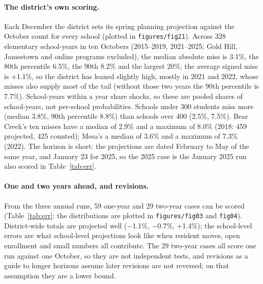 \documentclass[11pt]{article}
\begin{document}
\paragraph{The district's own scoring.} Each December the district sets its spring planning projection against the October count for every school (plotted in \texttt{figures/fig21}). Across 328 elementary school-years in ten Octobers (2015--2019, 2021--2025; Gold Hill, Jamestown and online programs excluded), the median absolute miss is 3.1\%, the 80th percentile 6.5\%, the 90th 8.2\% and the largest 20\%; the average signed miss is +1.1\%, so the district has leaned slightly high, mostly in 2021 and 2022, whose misses also supply most of the tail (without those two years the 90th percentile is 7.7\%). School-years within a year share shocks, so these are pooled shares of school-years, not per-school probabilities. Schools under 300 students miss more (median 3.8\%, 90th percentile 8.8\%) than schools over 400 (2.5\%, 7.5\%). Bear Creek's ten misses have a median of 2.9\% and a maximum of 8.0\% (2018: 459 projected, 425 counted); Mesa's a median of 3.6\% and a maximum of 7.3\% (2022). The horizon is short: the projections are dated February to May of the same year, and January 23 for 2025, so the 2025 case is the January 2025 run also scored in Table~\ref{tab:err}.


\paragraph{One and two years ahead, and revisions.} From the three annual runs, 59 one-year and 29 two-year cases can be scored (Table~\ref{tab:err}; the distributions are plotted in \texttt{figures/fig03} and \texttt{fig04}). District-wide totals are projected well ($-$1.1\%, $-$0.7\%, +1.4\%); the school-level errors are what school-level projections look like when resident moves, open enrollment and small numbers all contribute. The 29 two-year cases all score one run against one October, so they are not independent tests, and revisions as a guide to longer horizons assume later revisions are not reversed; on that assumption they are a lower bound.
\end{document}

